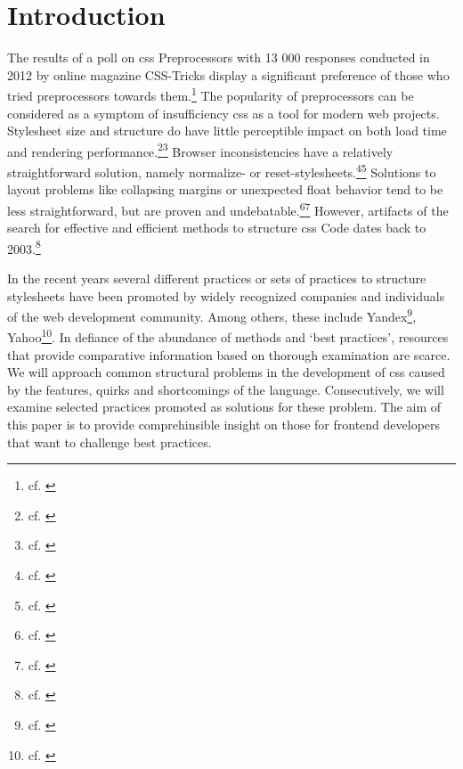 \chapter{Introduction}
The results of a poll on \gls{css} Preprocessors with 13 000 responses conducted in 2012 by online magazine CSS-Tricks display a significant preference of those who tried preprocessors towards them.\footnote{cf. \cite{preprocessorpoll}}
The popularity of preprocessors can be considered as a symptom of insufficiency \gls{css} as a tool for modern web projects.
Stylesheet size and structure do have little perceptible impact on both load time and rendering performance.\footnote{cf. \cite{soundersonselectorperformance}}\footnote{cf. \cite{atkinsondryscope}}
Browser inconsistencies have a relatively straightforward solution, namely normalize- or reset-stylesheets.\footnote{cf. \cite{meyeronreset}}\footnote{cf. \cite{gallagheronnormalize}}
Solutions to layout problems like collapsing margins or unexpected float behavior tend to be less straightforward, but are proven and undebatable.\footnote{cf. \cite{meyeronfloats}}\footnote{cf. \cite{meyeronmargins}}
However, artifacts of the search for effective and efficient methods to structure \gls{css} Code dates back to 2003.\footnote{cf. \cite{methodmails}}

In the recent years several different practices or sets of practices to structure stylesheets have been promoted by widely recognized companies and individuals of the web development community.
Among others, these include Yandex\footnote{cf. \cite{bem}}, Yahoo\footnote{cf. \cite{atomiccsssite}}.
In defiance of the abundance of methods and `best practices', resources that provide comparative information based on thorough examination are scarce.
We will approach common structural problems in the development of \gls{css} caused by the features, quirks and shortcomings of the language.
Consecutively, we will examine selected practices promoted as solutions for these problem.
The aim of this paper is to provide comprehinsible insight on those for frontend developers that want to challenge best practices.









